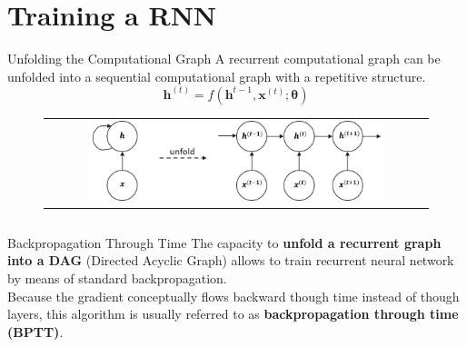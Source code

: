 \documentclass[aspectratio=169]{beamer}
\begin{document}

\section{Training a RNN}

\begin{frame}{Unfolding the Computational Graph}
A recurrent computational graph can be unfolded into a sequential computational graph with a repetitive structure.
\begin{equation*}
\bm{h}^{(t)} = f(\bm{h}^{t-1}, \bm{x}^{(t)}; \bm{\theta})
\end{equation*}
\begin{figure}
\begin{tabular}{c}
\includegraphics[width=0.8\textwidth]{img/rnn/rnn_unfold.png}
\end{tabular}
\end{figure}
\begin{columns}
\end{columns}
\end{frame}


\begin{frame}{Backpropagation Through Time}
The capacity to \textbf{unfold a recurrent graph into a DAG} (Directed Acyclic Graph) allows to train recurrent neural network by means of standard backpropagation.\\
\vspace{0.5cm}
Because the gradient conceptually flows backward though time instead of though layers, this algorithm is usually referred to as \textbf{backpropagation through time (BPTT)}.
\end{frame}

\end{document}
